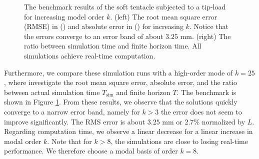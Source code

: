 \begin{example}
{\begin{figure}[!t]
  \caption{The benchmark results of the soft tentacle subjected to a tip-load for increasing model order $k$. (left) The root mean square error (RMSE) in () and absolute error in () for increasing $k$. Notice that the errors converge to an error band of about $3.25$ \si{\milli \meter}. (right) The ratio between simulation time and finite horizon time. All simulations achieve real-time computation. }
  \label{fig:C3:EX2:mode_convergence_bench}
  \end{figure}
 }
 
 Furthermore, we compare these simulation runs with a high-order mode of $k = 25$, where investigate the root mean square error, absolute error, and the ratio between actual simulation time $T_{\textrm{sim}}$ and finite horizon $T$. The benchmark is shown in Figure \ref{fig:C3:EX2:mode_convergence_bench}. From these results, we observe that the solutions quickly converge to a narrow error band, namely for $k>3$ the error does not seem to improve significantly. The RMS error is about $3.25$ \si{\milli \meter} or $2.7\%$ normalized by $L$.  Regarding computation time, we observe a linear decrease for a linear increase in modal order $k$. Note that for $k > 8$, the simulations are close to losing real-time performance. We therefore choose a modal basis of order $k = 8$. 
\end{example}

